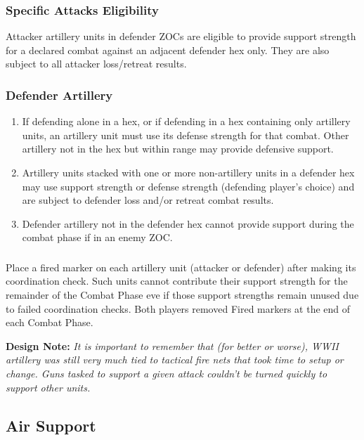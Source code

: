\subsubsection{\textbf{Specific Attacks Eligibility}}

Attacker artillery units in defender ZOCs are eligible to provide support strength for a declared combat against an adjacent defender hex only. They are also subject to all attacker loss/retreat results.

\subsubsection{\textbf{Defender Artillery}}
\begin{enumerate}[label=\alph*.]
    \item If defending alone in a hex, or if defending in a hex containing only artillery units, an artillery unit must use its defense strength for that combat. Other artillery not in the hex but within range may provide defensive support.
    \item Artillery units stacked with one or more non-artillery units in a defender hex may use support strength or defense strength (defending player's choice) and are subject to defender loss and/or retreat combat results.
    \item Defender artillery not in the defender hex cannot provide support during the combat phase if in an enemy ZOC.
\end{enumerate}

\subsubsection{} Place a fired marker on each artillery unit (attacker or defender) after making its coordination check. Such units cannot contribute their support strength for the remainder of the Combat Phase eve if those support strengths remain unused due to failed coordination checks. Both players removed Fired markers at the end of each Combat Phase.
    
\textbf{Design Note:} \textit{It is important to remember that (for better or worse), WWII artillery was still very much tied to tactical fire nets that took time to setup or change. Guns tasked to support a given attack couldn't be turned quickly to support other units.}


\subsection{Air Support}

